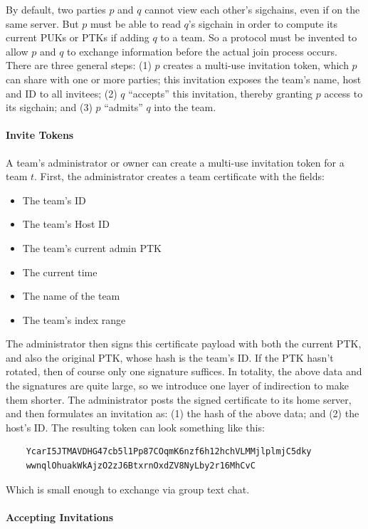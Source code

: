 By default, two parties $p$ and $q$ cannot view each other's sigchains, even if on the same
server. But $p$ must be able to read $q$'s sigchain in order to compute its current
PUKs or PTKs if adding $q$ to a team. So a protocol must be invented to allow $p$ and $q$
to exchange information before the actual join process occurs. There are three general
steps: (1) $p$ creates a multi-use invitation token, which $p$ can share with one or
more parties; this invitation exposes the team's name, host and ID to all invitees; 
(2) $q$ ``accepts'' this invitation, thereby granting $p$ access to its sigchain;
and (3) $p$ ``admits'' $q$ into the team.

\paragraph{Invite Tokens}

A team's administrator or owner can create a multi-use invitation token for a team $t$.
First, the administrator creates a team certificate with the fields:

\begin{itemize}[noitemsep]
    \item The team's ID
    \item The team's Host ID
    \item The team's current admin PTK
    \item The current time
    \item The name of the team
    \item The team's index range
\end{itemize}
%
The administrator then signs this certificate payload with both the current PTK, 
and also the original PTK, whose hash is the team's ID.  If the PTK hasn't rotated,
then of course only one signature suffices. In totality, the above data and the signatures
are quite large, so we introduce one layer of indirection to make them shorter. 
The administrator posts the signed certificate to its home server, and then formulates
an invitation as: (1) the hash of the above data; and (2) the host's ID. The
resulting token can look something like this:
%
\begin{verbatim}
    YcarI5JTMAVDHG47cb5l1Pp87COqmK6nzf6h12hchVLMMjlplmjC5dky
    wwnqlOhuakWkAjzO2zJ6BtxrnOxdZV8NyLby2r16MhCvC
\end{verbatim}
% 
Which is small enough to exchange via group text chat.

\paragraph{Accepting Invitations}


